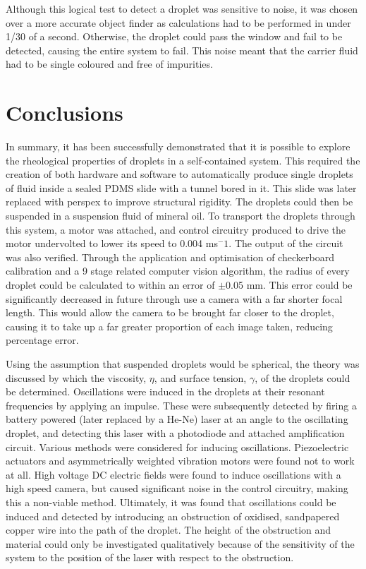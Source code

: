 \documentclass{physics_article_B}
\begin{document}
    Although this logical test to detect a droplet was sensitive to noise, it was chosen over a more accurate object finder as calculations had to be performed in under 1/30 of a second. Otherwise, the droplet could pass the window and fail to be detected, causing the entire system to fail. This noise meant that the carrier fluid had to be single coloured and free of impurities.
    
\section{Conclusions\label{sect:conc}}

    In summary, it has been successfully demonstrated that it is possible to explore the rheological properties of droplets in a self-contained system. This required the creation of both hardware and software to automatically produce single droplets of fluid inside a sealed PDMS slide with a tunnel bored in it. This slide was later replaced with perspex to improve structural rigidity. The droplets could then be suspended in a suspension fluid of mineral oil. To transport the droplets through this system, a motor was attached, and control circuitry produced to drive the motor undervolted to lower its speed to 0.004 ms$^-1$. The output of the circuit was also verified. Through the application and optimisation of checkerboard calibration and a 9 stage related computer vision algorithm, the radius of every droplet could be calculated to within an error of $\pm$0.05 mm. This error could be significantly decreased in future through use a camera with a far shorter focal length. This would allow the camera to be brought far closer to the droplet, causing it to take up a far greater proportion of each image taken, reducing percentage error.
    
    Using the assumption that suspended droplets would be spherical, the theory was discussed by which the viscosity, $\eta$, and surface tension, $\gamma$, of the droplets could be determined. Oscillations were induced in the droplets at their resonant frequencies by applying an impulse. These were subsequently detected by firing a battery powered (later replaced by a He-Ne) laser at an angle to the oscillating droplet, and detecting this laser with a photodiode and attached amplification circuit. Various methods were considered for inducing oscillations. Piezoelectric actuators and asymmetrically weighted vibration motors were found not to work at all. High voltage DC electric fields were found to induce oscillations with a high speed camera, but caused significant noise in the control circuitry, making this a non-viable method. Ultimately, it was found that oscillations could be induced and detected by introducing an obstruction of oxidised, sandpapered copper wire into the path of the droplet. The height of the obstruction and material could only be investigated qualitatively because of the sensitivity of the system to the position of the laser with respect to the obstruction. 
    
\end{document}
